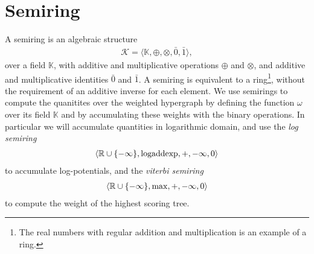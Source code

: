 \section{Semiring}
  A semiring is an algebraic structure
  \begin{align*}
    \mathcal{K} = \langle \mathbb{K}, \oplus, \otimes, \bar{0}, \bar{1} \rangle,
  \end{align*}
  over a field $\mathbb{K}$, with additive and multiplicative operations $\oplus$ and $\otimes$, and additive and multiplicative identities $\bar{0}$ and $\bar{1}$. A semiring  is equivalent to a ring\footnote{The real numbers with regular addition and multiplication is an example of a ring.}, without the requirement of an additive inverse for each element. We use semirings to compute the quanitites over the weighted hypergraph by defining the function $\omega$ over its field $\mathbb{K}$ and by accumulating these weights with the binary operations. In particular we will accumulate quantities in logarithmic domain, and use the \textit{log semiring}
  \begin{align}
    \langle \mathbb{R} \cup \{ -\infty \}, \text{logaddexp}, +, -\infty, 0 \rangle
  \end{align}
  to accumulate log-potentials, and the \textit{viterbi semiring}
  \begin{align}
    \langle \mathbb{R} \cup \{ -\infty \}, \max, +, -\infty, 0 \rangle
  \end{align}
  to compute the weight of the highest scoring tree.


